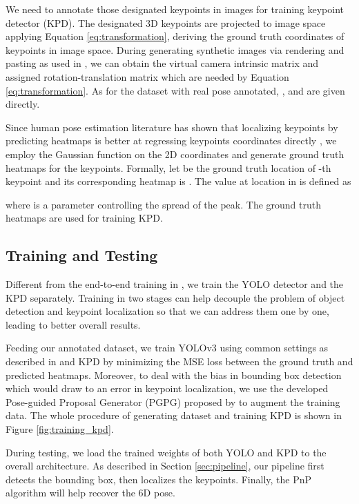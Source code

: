 \documentclass[10pt,twocolumn,letterpaper]{article}
\begin{document}
We need to annotate those designated keypoints in images for training keypoint detector (KPD). The designated 3D keypoints are projected to image space applying Equation \ref{eq:transformation}, deriving the ground truth coordinates of  keypoints in image space. During generating synthetic images via rendering and pasting as used in \cite{Kehl2017SSD6DMR,Sundermeyer_2018_ECCV,Rad2017BB8AS}, we can obtain the virtual camera intrinsic matrix  and assigned rotation-translation matrix  which are needed by Equation \ref{eq:transformation}. As for the dataset with real pose annotated, ,  and  are given directly.

Since human pose estimation literature has shown that localizing keypoints by predicting heatmaps \cite{Newell2016StackedHN, tompson2014joint, wei2016convolutional} is better at regressing keypoints coordinates directly \cite{toshev2014deeppose}, we employ the Gaussian function on the 2D coordinates and generate  ground truth heatmaps for the  keypoints. Formally, let  be the ground truth location of -th keypoint and its corresponding heatmap is . The value at location  in  is defined as

where  is a parameter controlling the spread of the peak. The ground truth heatmaps are used for training KPD.

\subsection{Training and Testing}
Different from the end-to-end training in \cite{tekin18}, we train the YOLO detector and the KPD separately. Training in two stages can help decouple the problem of object detection and keypoint localization so that we can address them one by one, leading to better overall results.

Feeding our annotated dataset, we train YOLOv3 using common settings as described in \cite{DBLP:journals/corr/abs-1804-02767} and KPD by minimizing the MSE loss between the ground truth and predicted heatmaps. Moreover, to deal with the bias in bounding box detection which would draw to an error in keypoint localization, we use the developed Pose-guided Proposal Generator (PGPG) proposed by \cite{fang2017rmpe} to augment the training data. The whole procedure of generating dataset and training KPD is shown in Figure \ref{fig:training_kpd}.

During testing, we load the trained weights of both YOLO and KPD to the overall architecture. As described in Section \ref{sec:pipeline}, our pipeline first detects the bounding box, then localizes the keypoints. Finally, the PnP algorithm will help recover the 6D pose.
\end{document}
